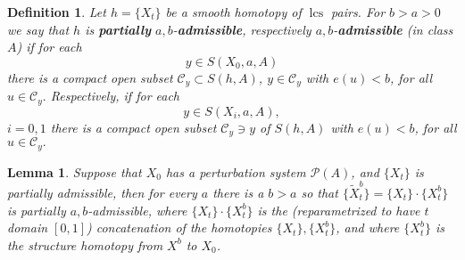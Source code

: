 \documentclass{amsart}
\numberwithin{equation}{section}
\newtheorem{lemma}[equation]{Lemma}
\newtheorem{definition}[equation]{Definition}
\theoremstyle{definition}
\theoremstyle{remark}
\DeclareMathOperator{\lcs}{lcs}
\begin{document}
\begin{definition} \label{def:admissiblehomotopy}
  Let $h=\{X _{t} \}$ be a smooth homotopy of $\lcs$ pairs. For $b >a >0$ we say that $h$ is \textbf{\emph{partially}} $a,b$-\textbf{\emph{admissible}}, respectively $a,b$-\textbf{\emph{admissible}} (in class $A$)  if 
   for each $$y \in S (X _{0},a, A) $$ there is a compact open subset $\mathcal{C} _{y} \subset S (h, A)$, $y \in \mathcal{C} _{y}$ with $e (u) <b$, for all $u \in \mathcal{C} _{y}.
   $  %
Respectively,
if for each $$y \in S (X _{i},a, A), $$ $i=0,1$
there is a compact open subset $\mathcal{C} _{y} \ni y $ of $S (h,A)$ with $e (u) <b$, for all $u \in \mathcal{C} _{y}.$
 \end {definition}
\begin{lemma} \label{lemma:partiallyadmissible} Suppose that $X _{0} $ has a perturbation system $\mathcal{P} (A)$, and $\{X _{t} \}$ is
partially admissible,  then for every $a$  
there is a $b>a$ so that $\{\widetilde{X}  ^{b}_t   \} =  \{X _{t}
 \} \cdot \{X ^{b} _ t
 \} $
 is partially $a,b$-admissible, where $\{X _{t}
 \} \cdot \{X ^{b} _ t
 \} $ is the (reparametrized to have $t$ domain $[0,1]$) concatenation of the homotopies $\{X _{t} \}, \{X
 ^{b} _{t}  \}$, and where  $\{X  ^{b} _ t  \}$ is the structure
 homotopy from 
 $X  ^{b  }  $ to $X _{0} $.
\end{lemma}
\end{document}
